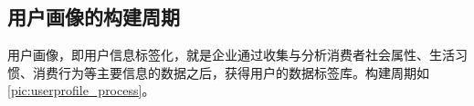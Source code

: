 		\subsection{用户画像的构建周期}
		用户画像，即用户信息标签化，就是企业通过收集与分析消费者社会属性、生活习惯、消费行为等主要信息的数据之后，获得用户的数据标签库。构建周期如\autoref{pic:userprofile_process}。
		\begin{figure}
	    \centering
	      \label{pic:userprofile_process}
	    \end{figure}
